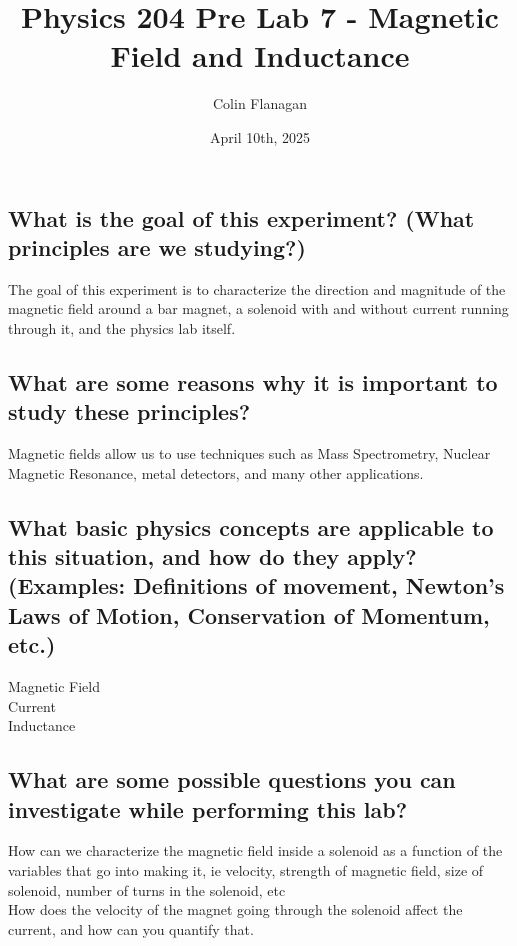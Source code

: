 \documentclass{article}
\title{Physics 204 Pre Lab 7 - Magnetic Field and Inductance}
\author{Colin Flanagan}
\date{April 10th, 2025}
\begin{document}
\maketitle

\subsection*{What is the goal of this experiment? (What principles are we studying?)}

    The goal of this experiment is to characterize the direction and magnitude of the magnetic field around a bar magnet, a solenoid with and without current running through it, and the physics lab itself.

\subsection*{What are some reasons why it is important to study these principles?
}

  Magnetic fields allow us to use techniques such as Mass Spectrometry, Nuclear Magnetic Resonance, metal detectors, and many other applications.
    
\subsection*{What basic physics concepts are applicable to this situation, and how do they apply? (Examples: Definitions of movement, Newton’s Laws of Motion, Conservation of Momentum, etc.)}

    Magnetic Field\\

    \noindent Current\\

    \noindent Inductance\\
    
\subsection*{What are some possible questions you can investigate while performing this lab?
}

   How can we characterize the magnetic field inside a solenoid as a function of the variables that go into making it, ie velocity, strength of magnetic field, size of solenoid, number of turns in the solenoid, etc\\

   \noindent How does the velocity of the magnet going through the solenoid affect the current, and how can you quantify that.\\
\end{document}
